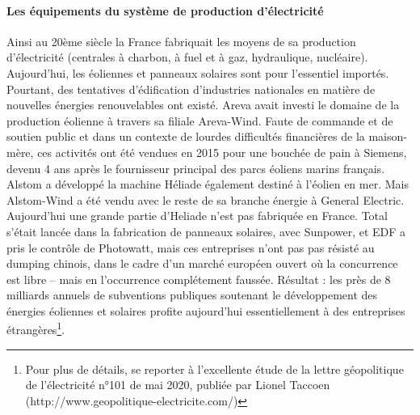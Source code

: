 \documentclass[a4paper]{article}
\begin{document}
\paragraph{Les équipements du système de production d’électricité}
Ainsi au 20ème siècle la France fabriquait les moyens de sa production d’électricité (centrales à charbon, à fuel et à gaz, hydraulique, nucléaire). Aujourd’hui, les éoliennes et panneaux solaires sont pour l’essentiel importés. Pourtant, des tentatives d’édification d’industries nationales en matière de nouvelles énergies renouvelables ont existé. Areva avait investi le domaine de la production éolienne à travers sa filiale Areva-Wind. Faute de commande et de soutien public et dans un contexte de lourdes difficultés financières de la maison-mère, ces activités ont été vendues en 2015 pour une bouchée de pain à Siemens, devenu 4 ans après le fournisseur principal des parcs éoliens marins français.  Alstom a développé la machine Héliade également destiné à l’éolien en mer. Mais Alstom-Wind a été vendu avec le reste de sa branche énergie à General Electric. Aujourd’hui une grande partie d’Heliade n’est pas fabriquée en France. Total s’était lancée dans la fabrication de panneaux solaires, avec Sunpower, et EDF a pris le contrôle de Photowatt,  mais ces entreprises n’ont pas pas résisté au dumping chinois, dans le cadre d’un marché européen ouvert où la concurrence est libre – mais en l’occurrence complétement faussée. Résultat : les près de 8 milliards annuels de subventions publiques soutenant le développement des énergies éoliennes et solaires profite aujourd’hui essentiellement à des entreprises étrangères\footnote{Pour plus de détails, se reporter à l’excellente étude de la lettre géopolitique de l’électricité n°101 de mai 2020, publiée par Lionel Taccoen (http://www.geopolitique-electricite.com/)}. 
\end{document}

